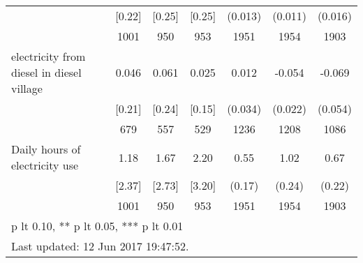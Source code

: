 \begin{table}[htbp]
\begin{tabular*}{1\hsize}{@{\hskip\tabcolsep\extracolsep\fill}l*{1}{cccccc}}
                                &   [0.22]&   [0.25]&   [0.25]&  (0.013)         &  (0.011)         &  (0.016)         \\
                                &     1001&      950&      953&     1951         &     1954         &     1903         \\
electricity from diesel in diesel village&    0.046&    0.061&    0.025&    0.012         &   -0.054\sym{**} &   -0.069         \\
                                &   [0.21]&   [0.24]&   [0.15]&  (0.034)         &  (0.022)         &  (0.054)         \\
                                &      679&      557&      529&     1236         &     1208         &     1086         \\
Daily hours of electricity use  &     1.18&     1.67&     2.20&     0.55\sym{***}&     1.02\sym{***}&     0.67\sym{***}\\
                                &   [2.37]&   [2.73]&   [3.20]&   (0.17)         &   (0.24)         &   (0.22)         \\
                                &     1001&      950&      953&     1951         &     1954         &     1903         \\
\bottomrule
\multicolumn{7}{l}{\footnotesize * p lt 0.10, ** p lt 0.05, *** p lt 0.01}\\
\multicolumn{7}{l}{\footnotesize Last updated: 12 Jun 2017 19:47:52.}\\
\end{tabular*}
\end{table}
